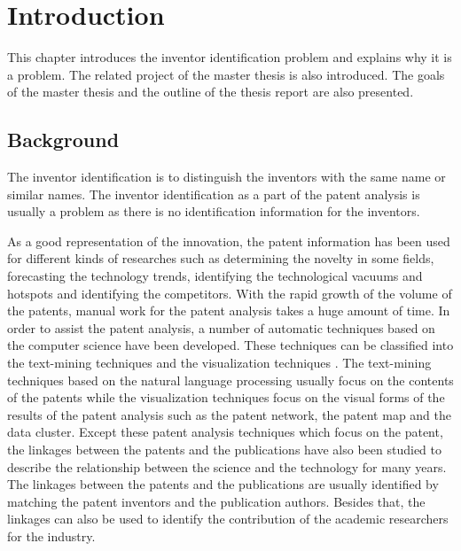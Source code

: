 \chapter{Introduction}
\label{cha:intro}
This chapter introduces the inventor identification problem and explains why it is a problem. The related project of the master thesis is also introduced. The goals of the master thesis and the outline of the thesis report are also presented.

\section{Background}
The inventor identification is to distinguish the inventors with the same name or similar names. The inventor identification as a part of the patent analysis is usually a problem as there is no identification information for the inventors.\newline

As a good representation of the innovation, the patent information has been used for different kinds of researches such as determining the novelty in some fields, forecasting the technology trends, identifying the technological vacuums and hotspots and identifying the competitors. With the rapid growth of the volume of the patents, manual work for the patent analysis takes a huge amount of time. In order to assist the patent analysis, a number of automatic techniques based on the computer science have been developed. These techniques can be classified into the text-mining techniques and the visualization techniques \cite{Abbas20143}. The text-mining techniques based on the natural language processing usually focus on the contents of the patents while the visualization techniques focus on the visual forms of the results of the patent analysis such as the patent network, the patent map and the data cluster.  Except these patent analysis techniques which focus on the patent, the linkages between the patents and the publications have also been studied to describe the relationship between the science and the technology for many years. The linkages between the patents and the publications are usually identified by matching the patent inventors and the publication authors.  Besides that, the linkages can also be used to identify the contribution of the academic researchers for the industry. \newline

